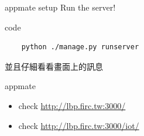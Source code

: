 \documentclass{beamer}
\begin{document}
\begin{frame}[fragile]{appmate setup}
  Run the server!
  \begin{block}{code}
  \begin{verbatim}
    python ./manage.py runserver
  \end{verbatim}
  \end{block}

  並且仔細看看畫面上的訊息
\end{frame}

\begin{frame}{appmate}
  \begin{itemize}
    \item check \url{http://lbp.firc.tw:3000/}

    \item check \url{http://lbp.firc.tw:3000/iot/}
  \end{itemize}
\end{frame}
\end{document}
